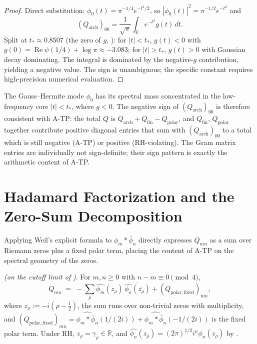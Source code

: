 \begin{proof}
Direct substitution: \(\phi_{0}(t)=\pi^{-1/4}e^{-t^{2}/2}\),
so \(|\phi_{0}(t)|^{2}=\pi^{-1/2}e^{-t^{2}}\) and
\[
(Q_{\mathrm{arch}})_{00}=\frac{1}{\sqrt{\pi}}\int_{\mathbb{R}}e^{-t^{2}}g(t)\,dt.
\]
Split at \(t_{\ast}\approx 0.8507\) (the zero of \(g\),
): for \(|t|<t_{\ast}\), \(g(t)<0\) with
\(g(0)=\operatorname{Re}\psi(1/4)+\log\pi\approx-3.083\); for
\(|t|>t_{\ast}\), \(g(t)>0\) with Gaussian decay dominating. The
integral is dominated by the negative-\(g\) contribution, yielding a
negative value. The sign is unambiguous; the specific constant
requires high-precision numerical evaluation.
\end{proof}

\begin{remark}
\label{v4-arith:w7-h:rem:negative-is-necessary}
The Gauss--Hermite mode \(\phi_{0}\) has its spectral mass concentrated
in the low-frequency core \(|t|<t_{\ast}\), where \(g<0\). The negative
sign of \((Q_{\mathrm{arch}})_{00}\) is therefore consistent with
A-TP: the total \(Q\) is \(Q_{\mathrm{arch}}+Q_{\mathrm{fin}}-Q_{\mathrm{polar}}\),
and \(Q_{\mathrm{fin}}\), \(Q_{\mathrm{polar}}\) together contribute
positive diagonal entries that sum with \((Q_{\mathrm{arch}})_{00}\)
to a total which is still negative (A-TP) or positive (RH-violating).
The Gram matrix entries are individually not sign-definite; their
sign pattern is exactly the arithmetic content of A-TP.
\end{remark}

\section{Hadamard Factorization and the Zero-Sum Decomposition}
\label{v4-arith:w7-h:hadamard}

Applying Weil's explicit formula to \(\phi_{m}*\widetilde{\phi_{n}}\)
directly expresses \(Q_{mn}\) as a sum over Riemann zeros plus a fixed
polar term, placing the content of A-TP on the spectral geometry of
the zeros.

\begin{theorem}
\label{v4-arith:w7-h:thm:hadamard}
\ClaimStatusProvedHereConditional \emph{(on the cutoff limit of
)}. For \(m,n\geq 0\) with
\(n-m\equiv 0\pmod{4}\),
\begin{equation}
\label{v4-arith:w7-h:eq:hadamard}
Q_{mn}\;=\;-\!\sum_{\rho}\widehat{\phi_{m}}(z_{\rho})\,
\overline{\widehat{\phi_{n}}(\overline{z_{\rho}})}
+(Q_{\mathrm{polar,fixed}})_{mn},
\end{equation}
where \(z_{\rho}:=-i(\rho-\tfrac12)\), the sum runs over non-trivial
zeros with multiplicity, and
\((Q_{\mathrm{polar,fixed}})_{mn}=
\widehat{\phi_{m}*\widetilde{\phi_{n}}}(1/(2i))+\widehat{\phi_{m}*\widetilde{\phi_{n}}}(-1/(2i))\)
is the fixed polar term. Under RH, \(z_{\rho}=\gamma_{\rho}\in\mathbb{R}\),
and \(\widehat{\phi_{n}}(z_{\rho})=(2\pi)^{1/2}i^{n}\phi_{n}(z_{\rho})\)
by .
\end{theorem}

